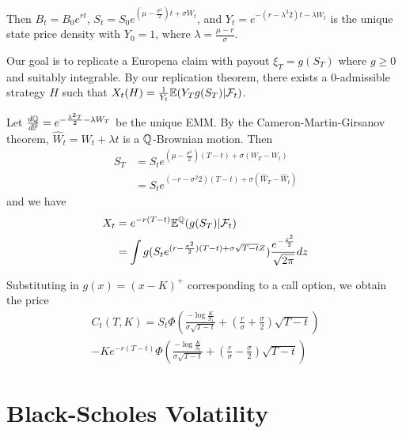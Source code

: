 Then $B_t = B_{0} e^{rt}$, $S_{t} = S_{0} e^{(\mu -
  \frac{\sigma^{2}}{2})t + \sigma W_{t}}$, and $Y_{t} = e^{-(r -
  \lambda^{2}{2})t - \lambda W_{t}}$ is the unique state price density
with $Y_{0} = 1$, where $\lambda = \frac{\mu - r}{\sigma}$.

Our goal is to replicate a Europena claim with payout $\xi_{T} =
g(S_{T})$ where $g \geq 0$ and suitably integrable.  By our
replication theorem, there exists a 0-admissible strategy $H$ such
that $X_{t}(H) = \frac{1}{Y_{t}} \E{Y_{T} g(S_{T}) |
  \mathcal{F}_{t}}$.

Let $\frac{d\Q}{d\Prob} = e^{-\frac{\lambda^{2}T}{2} - \lambda W_{T}}$
be the unique EMM.  By the Cameron-Martin-Girsanov theorem, $\hat
W_{t} = W_{t} + \lambda t$ is a $\Q$-Brownian motion.  Then
\begin{align}
  \label{eq:89}
  S_{T} &= S_{t} e^{(\mu - \frac{\sigma^{2}}{2})(T-t) + \sigma(W_{T} -
    W_{t})} \\
  &= S_{t} e^{(-r - \sigma^{2}{2})(T-t) + \sigma(\hat W_{T} - \hat W_{t})}
\end{align} and we have
\begin{align}
  \label{eq:88}
  X_{t} &= e^{-r(T-t)} \mathbb{E}^{\Q}(g(S_{T}) | \mathcal{F}_{t}) \\
  &= \int g(S_{t} e^{(r - \frac{\sigma^{2}}{2})(T-t) +
    \sigma\sqrt{T-t} Z}) \frac{e^{-\frac{z^{2}}{2}}}{\sqrt{2 \pi}} dz
\end{align}

Substituting in $g(x) = (x - K)^{+}$ corresponding to a call option,
we obtain the price
\begin{multline}
  \label{eq:90}
  C_{t}(T, K) = S_{t} \Phi(\frac{-\log \frac{K}{S_{t}}}{\sigma \sqrt{T
      - t}} + (\frac{r}{\sigma} + \frac{\sigma}{2})\sqrt{T-t}) \\ -
  Ke^{-r(T-t)} \Phi(\frac{-\log \frac{K}{S_{t}}}{\sigma \sqrt{T-t}} +
  (\frac{r}{\sigma} - \frac{\sigma}{2}) \sqrt{T-t})
\end{multline}


\section{Black-Scholes Volatility}
\label{sec:black-schol-volat}

